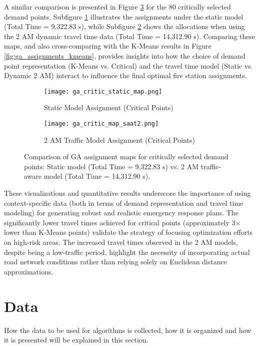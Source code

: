 \documentclass[conference]{IEEEtran}
\begin{document}
A similar comparison is presented in Figure \ref{fig:ga_assignments_critical} for the 80 critically selected demand points. Subfigure \ref{fig:ga_critic_static_map_only} illustrates the assignments under the static model (Total Time = 9,322.83 s), while Subfigure \ref{fig:ga_critic_map_saat2_only} shows the allocations when using the 2 AM dynamic travel time data (Total Time = 14,312.90 s). Comparing these maps, and also cross-comparing with the K-Means results in Figure \ref{fig:ga_assignments_kmeans}, provides insights into how the choice of demand point representation (K-Means vs. Critical) and the travel time model (Static vs. Dynamic 2 AM) interact to influence the final optimal fire station assignments. 

\begin{figure}[htbp]
    \centering
    \begin{subfigure}[b]{0.49\textwidth}
        \centering
        \texttt{[image: ga\_critic\_static\_map.png]}
        \caption{Static Model Assignment (Critical Points)}
        \label{fig:ga_critic_static_map_only}
    \end{subfigure}
    \hfill
    \begin{subfigure}[b]{0.49\textwidth}
        \centering
        \texttt{[image: ga\_critic\_map\_saat2.png]}
        \caption{2 AM Traffic Model Assignment (Critical Points)}
        \label{fig:ga_critic_map_saat2_only}
    \end{subfigure}
    \caption{Comparison of GA assignment maps for critically selected demand points: Static model (Total Time = 9,322.83 s) vs. 2 AM traffic-aware model (Total Time = 14,312.90 s).}
    \label{fig:ga_assignments_critical}
\end{figure}

These visualizations and quantitative results underscore the importance of using context-specific data (both in terms of demand representation and travel time modeling) for generating robust and realistic emergency response plans. The significantly lower travel times achieved for critical points (approximately 3$\times$ lower than K-Means points) validate the strategy of focusing optimization efforts on high-risk areas. The increased travel times observed in the 2 AM models, despite being a low-traffic period, highlight the necessity of incorporating actual road network conditions rather than relying solely on Euclidean distance approximations.

\section*{\textbf{Data}}
How the data to be used for algorithms is collected, how it
is organized and how it is presented will be explained in this
section.
\end{document}
